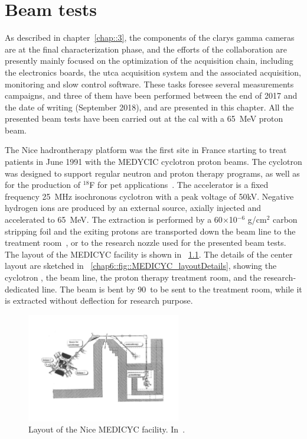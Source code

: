\chapter{Beam tests}\label{chap::6}

\vfill

\minitoc

\newpage

\glsresetall
{} 


As described in chapter~\ref{chap::3}, the components of the \gls{clarys} gamma cameras are at the final characterization phase, and the efforts of the collaboration are presently mainly focused on the optimization of the acquisition chain, including the electronics boards, the \gls{utca} acquisition system and the associated acquisition, monitoring and slow control software. These tasks foresee several measurements campaigns, and three of them have been performed between the end of 2017 and the date of writing (September 2018), and are presented in this chapter. 
All the presented beam tests have been carried out at the \gls{cal} with a 65~MeV proton beam. 

The Nice hadrontherapy platform was the first site in France starting to treat patients in June 1991 with the MEDYCIC cyclotron proton beams. The cyclotron was designed to support regular neutron and proton therapy programs, as well as for the production of $^{18}$F for \gls{pet} applications~\parencite{Mandrillon1989, Mandrillon1992}. The accelerator is a fixed frequency 25~MHz isochronous cyclotron with a peak voltage of 50kV. Negative hydrogen ions are produced by an external source, axially injected and accelerated to 65~MeV. The extraction is performed by a 60$\times$10$^{-6}$ g/cm$^2$ carbon stripping foil and the exiting protons are transported down the beam line to the treatment room~\parencite{Herault2005}, or to the research nozzle used for the presented beam tests. The layout of the MEDICYC facility is shown in \figurename~\ref{chap6::fig::MEDICYC_layout}. The details of the center layout are sketched in \figurename~\ref{chap6::fig::MEDICYC_layoutDetails}, showing the cyclotron , the beam line, the proton therapy treatment room, and the research-dedicated line. The beam is bent by 90\textdegree ~to be sent to the treatment room, while it is extracted without deflection for research purpose.

 \begin{figure}[!htbp]
\centering
\includegraphics[width=0.6\textwidth]{03_GraphicFiles/chapter6_BeamTests/MEDiCYC.pdf}
\caption{Layout of the Nice MEDICYC facility. In~\cite{Mandrillon1992}.}
\label{chap6::fig::MEDICYC_layout}
\end{figure}

